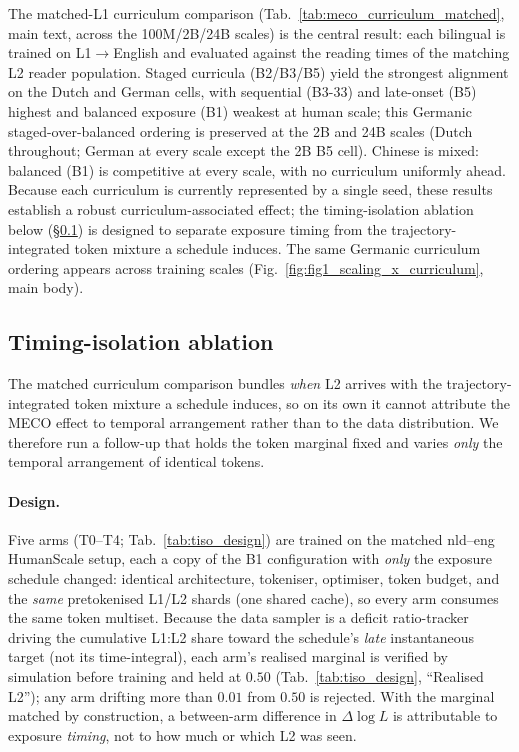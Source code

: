 The matched-L1 curriculum comparison (Tab.~\ref{tab:meco_curriculum_matched}, main text, across the 100M/2B/24B scales) is the central result: each \beetle{} bilingual is trained on L1$\to$English and evaluated against the reading times of the matching L2 reader population. Staged curricula (B2/B3/B5) yield the strongest alignment on the Dutch and German cells, with sequential (B3-33) and late-onset (B5) highest and balanced exposure (B1) weakest at human scale; this Germanic staged-over-balanced ordering is preserved at the 2B and 24B scales (Dutch throughout; German at every scale except the 2B B5 cell). Chinese is mixed: balanced (B1) is competitive at every scale, with no curriculum uniformly ahead. Because each curriculum is currently represented by a single seed, these results establish a robust curriculum-associated effect; the timing-isolation ablation below (\S\ref{sec:timing-isolation}) is designed to separate exposure timing from the trajectory-integrated token mixture a schedule induces. The same Germanic curriculum ordering appears across training scales (Fig.~\ref{fig:fig1_scaling_x_curriculum}, main body).
 
\subsection{Timing-isolation ablation}\label{sec:timing-isolation}
 
The matched curriculum comparison bundles \emph{when} L2 arrives with the trajectory-integrated token mixture a schedule induces, so on its own it cannot attribute the MECO effect to temporal arrangement rather than to the data distribution. We therefore run a follow-up that holds the token marginal fixed and varies \emph{only} the temporal arrangement of identical tokens.
 
\paragraph{Design.} Five arms (T0--T4; Tab.~\ref{tab:tiso_design}) are trained on the matched nld--eng HumanScale setup, each a copy of the B1 configuration with \emph{only} the exposure schedule changed: identical architecture, tokeniser, optimiser, token budget, and the \emph{same} pretokenised L1/L2 shards (one shared cache), so every arm consumes the same token multiset. Because the data sampler is a deficit ratio-tracker driving the cumulative L1:L2 share toward the schedule's \emph{late} instantaneous target (not its time-integral), each arm's realised marginal is verified by simulation before training and held at $0.50$ (Tab.~\ref{tab:tiso_design}, ``Realised L2''); any arm drifting more than $0.01$ from $0.50$ is rejected. With the marginal matched by construction, a between-arm difference in $\Delta\log L$ is attributable to exposure \emph{timing}, not to how much or which L2 was seen.
 
